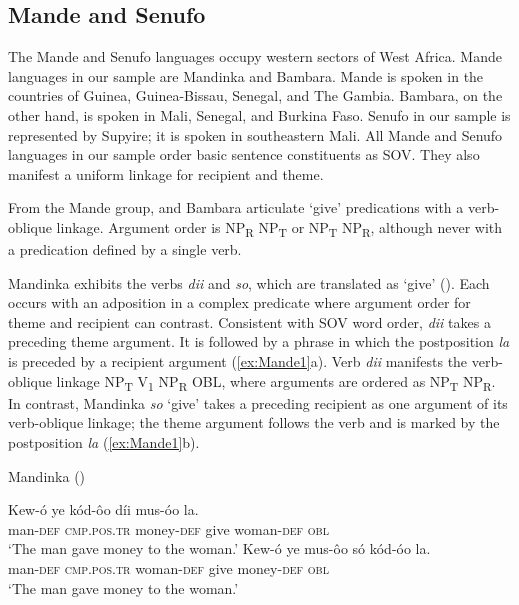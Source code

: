 \documentclass[output=paper,colorlinks,citecolor=brown]{langscibook}
\begin{document}
\subsection{Mande and Senufo}

The Mande and Senufo languages occupy western sectors of West Africa. Mande languages in our sample are Mandinka and Bambara. Mande is spoken in the countries of Guinea, Guinea-Bissau, Senegal, and The Gambia. Bambara, on the other hand, is spoken in Mali, Senegal, and Burkina Faso. Senufo in our sample is represented by Supyire; it is spoken in southeastern Mali. All Mande and Senufo languages in our sample order basic sentence constituents as SOV. They also manifest a uniform linkage for recipient and theme.

From the Mande group,  and Bambara articulate ‘give’ predications with a verb-oblique linkage. Argument order is NP\textsubscript{R} NP\textsubscript{T} or NP\textsubscript{T} NP\textsubscript{R}, although never with a predication defined by a single verb.

Mandinka exhibits the verbs \textit{dii} and \textit{so}, which are translated as ‘give’ (\cite{Creissels2015}). Each occurs with an adposition in a complex predicate where argument order for theme and recipient can contrast. Consistent with SOV word order, \textit{dii} takes a preceding theme argument. It is followed by a phrase in which the postposition \textit{la} is preceded by a recipient argument (\ref{ex:Mande1}a). Verb \textit{dii} manifests the verb-oblique linkage NP\textsubscript{T} V\textsubscript{1} NP\textsubscript{R} OBL, where arguments are ordered as NP\textsubscript{T} NP\textsubscript{R}. In contrast, Mandinka \textit{so} ‘give’ takes a preceding recipient as one argument of its verb-oblique linkage; the theme argument follows the verb and is marked by the postposition \textit{la} (\ref{ex:Mande1}b).

\ea \label{ex:Mande1} Mandinka (\cite [225] {Creissels2015})
\begin{xlist}
\ex
\gll Kew-ó				ye								kód-ôo				díi			mus-óo					la.\\
	man-\textsc{def}	\textsc{cmp.pos.tr}		money-\textsc{def}	give		woman-\textsc{def}	\textsc{obl}\\
\glt 						‘The man gave money to the woman.’
\ex 
\gll Kew-ó				ye								mus-ôo					só			kód-óo					la.\\
man-\textsc{def}	\textsc{cmp.pos.tr}		woman-\textsc{def}	give		money-\textsc{def}		\textsc{obl} \\
\glt 						‘The man gave money to the woman.’
\end{xlist}
\z
\end{document}
